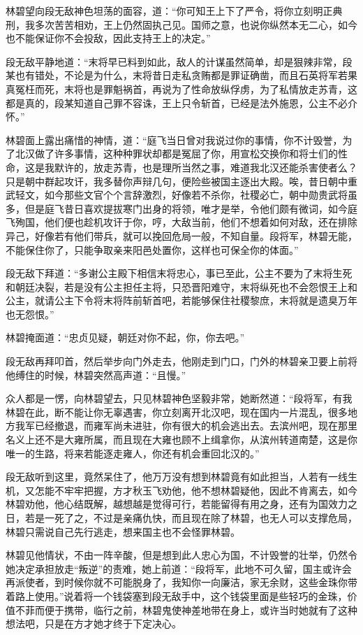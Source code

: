 林碧望向段无敌神色坦荡的面容，道：“你可知王上下了严令，将你立刻明正典刑，我多次苦苦相劝，王上仍然固执己见。国师之意，也说你纵然本无二心，如今也不能保证你不会投敌，因此支持王上的决定。”

段无敌平静地道：“末将早已料到如此，敌人的计谋虽然简单，却是狠辣非常，段某也有错处，不论是为什么，末将昔日走私贪贿都是罪证确凿，而且石英将军若果真冤枉而死，末将也是罪魁祸首，再说为了性命放纵俘虏，为了私情放走苏青，这都是真的，段某知道自己罪不容诛，王上只令斩首，已经是法外施恩，公主不必介怀。”

林碧面上露出痛惜的神情，道：“庭飞当日曾对我说过你的事情，你不计毁誉，为了北汉做了许多事情，这种种罪状却都是冤屈了你，用宣松交换你和将士们的性命，这是我默许的，放走苏青，也是理所当然之事，难道我北汉还能杀害使者么？只是朝中群起攻讦，我多替你声辩几句，便险些被国主逐出大殿。唉，昔日朝中重武轻文，如今那些文官个个言辞激烈，好像若不杀你，社稷必亡，朝中勋贵武将虽多，但是庭飞昔日喜欢提拔寒门出身的将领，唯才是举，令他们颇有微词，如今庭飞殉国，他们便也趁机攻讦于你，哼，大敌当前，他们不想着如何对敌，还在排除异己，好像若有他们带兵，就可以挽回危局一般，不知自量。段将军，林碧无能，不能保住你了，只能争取亲来阳邑处置你，这样也可保全你的体面。”

段无敌下拜道：“多谢公主殿下相信末将忠心，事已至此，公主不要为了末将生死和朝廷决裂，若是没有公主担任主将，只恐晋阳难守，末将纵死也不会怨恨王上和公主，就请公主下令将末将阵前斩首吧，若能够保住社稷黎庶，末将就是遗臭万年也无怨恨。”

林碧掩面道：“忠贞见疑，朝廷对你不起，你，你去吧。”

段无敌再拜叩首，然后举步向门外走去，他刚走到门口，门外的林碧亲卫要上前将他缚住的时候，林碧突然高声道：“且慢。”

众人都是一愣，向林碧望去，只见林碧神色坚毅非常，她断然道：“段将军，有我林碧在此，断不能让你无辜遇害，你立刻离开北汉吧，现在国内一片混乱，很多地方我军已经撤退，而雍军尚未进驻，你有很大的机会逃出去。去滨州吧，现在那里名义上还不是大雍所属，而且现在大雍也顾不上缉拿你，从滨州转道南楚，这是你唯一的生路，将来若能逐走雍人，你还有机会重回北汉的。”

段无敌听到这里，竟然呆住了，他万万没有想到林碧竟有如此担当，人若有一线生机，又怎能不牢牢把握，方才秋玉飞劝他，他不想林碧疑他，因此不肯离去，如今林碧劝他，他心结既解，越想越是觉得可行，若能留得有用之身，还有为国效力之日，若是一死了之，不过是亲痛仇快，而且现在除了林碧，也无人可以支撑危局，林碧只需说自己先行逃走，想来国主也不会怪罪林碧。

林碧见他情状，不由一阵辛酸，但是想到此人忠心为国，不计毁誉的壮举，仍然令她决定承担放走“叛逆”的责难，她上前道：“段将军，此地不可久留，国主或许会再派使者，到时候你就不可能脱身了，我知你一向廉洁，家无余财，这些金珠你带着路上使用。”说着将一个钱袋塞到段无敌手中，这个钱袋里面是些轻巧的金珠，价值不菲而便于携带，临行之前，林碧鬼使神差地带在身上，或许当时她就有了这种想法吧，只是在方才她才终于下定决心。

